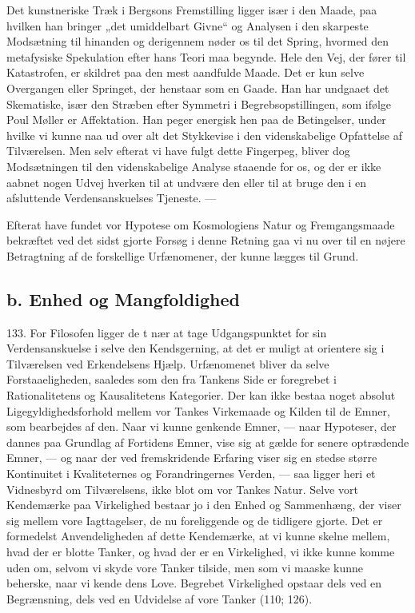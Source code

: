 \documentclass[12pt,a4paper]{book}
\newcommand{\opage}[1]{\marginnote{\footnotesize\textit{[#1]}}}
\begin{document}
Det kunstneriske Træk i Bergsons Fremstilling ligger især i den Maade, paa hvilken han
bringer „det umiddelbart Givne“ og Analysen i den skarpeste Modsætning til hinanden og
derigennem nøder os til det Spring, hvormed den metafysiske Spekulation efter hans Teori
maa begynde. Hele den Vej, der fører til Katastrofen, er skildret paa den mest aandfulde
Maade. Det er kun selve Overgangen eller Springet, der henstaar som en Gaade. Han har
undgaaet det Skematiske, især den Stræben efter Symmetri i Begrebsopstillingen, som
ifølge Poul Møller er Affektation. Han peger energisk hen paa de Betingelser, under
hvilke vi kunne naa ud over alt det Stykkevise i den videnskabelige Opfattelse af
Tilværelsen. Men selv efterat vi have fulgt dette Fingerpeg, bliver dog Modsætningen til
den videnskabelige Analyse staaende for os, og der er ikke aabnet nogen Udvej hverken til
at undvære den eller til at bruge den i en afsluttende Verdensanskuelses Tjeneste. ---

Efterat have fundet vor Hypotese om Kosmologiens Natur og Fremgangsmaade bekræftet ved
det sidst gjorte Forsøg i denne Retning gaa vi nu over til en nøjere Betragtning af de
forskellige Urfænomener, der kunne lægges til Grund.

\subsection*{b. Enhed og Mangfoldighed}

133. For Filosofen ligger de%
\opage{319}t nær at tage Udgangspunktet for sin Verdensanskuelse i selve
den Kendsgerning, at det er muligt at orientere sig i Tilværelsen ved Erkendelsens Hjælp.
Urfænomenet bliver da selve Forstaaeligheden, saaledes som den fra Tankens Side er
foregrebet i Rationalitetens og Kausalitetens Kategorier. Der kan ikke bestaa noget
absolut Ligegyldighedsforhold mellem vor Tankes Virkemaade og Kilden til de Emner, som
bearbejdes af den. Naar vi kunne genkende Emner, --- naar Hypoteser, der dannes paa
Grundlag af Fortidens Emner, vise sig at gælde for senere optrædende Emner, --- og naar der ved fremskridende Erfaring viser sig en stedse større Kontinuitet i Kvaliteternes og
Forandringernes Verden, --- saa ligger heri et Vidnesbyrd om Tilværelsens, ikke blot om
vor Tankes Natur. Selve vort Kendemærke paa Virkelighed bestaar jo i den Enhed og
Sammenhæng, der viser sig mellem vore Iagttagelser, de nu foreliggende og de tidligere
gjorte. Det er formedelst Anvendeligheden af dette Kendemærke, at vi kunne skelne mellem,
hvad der er blotte Tanker, og hvad der er en Virkelighed, vi ikke kunne komme uden om,
selvom vi skyde vore Tanker tilside, men som vi maaske kunne beherske, naar vi kende dens
Love. Begrebet Virkelighed opstaar dels ved en Begrænsning, dels ved en Udvidelse af vore
Tanker (110; 126).
\end{document}
